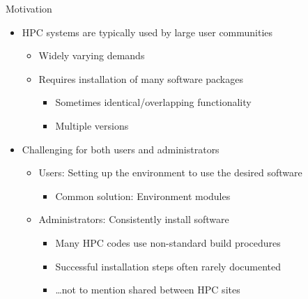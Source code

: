 \documentclass[10pt,xcolor={usenames,dvipsnames}]{beamer}
\begin{document}
\begin{frame}{Motivation}
\begin{itemize}
    \item
        HPC systems are typically used by large user communities
        \begin{itemize}
            \item
                Widely varying demands
            \item
                Requires installation of many software packages
                \begin{itemize}
                    \item
                        Sometimes identical/overlapping functionality
                    \item
                        Multiple versions
                \end{itemize}
        \end{itemize}
    \vspace{1ex}
    \item
        Challenging for both users and administrators
        \begin{itemize}
            \item
                Users: Setting up the environment to use the desired software
                \begin{itemize}
                    \item
                        Common solution: Environment modules
                \end{itemize}
            \item
                Administrators: Consistently install software
                \begin{itemize}
                    \item
                        Many HPC codes use non-standard build procedures
                    \item
                        Successful installation steps often rarely documented
                    \item
                        \ldots not to mention shared between HPC sites
                \end{itemize}
        \end{itemize}
\end{itemize}
\end{frame}

\end{document}
